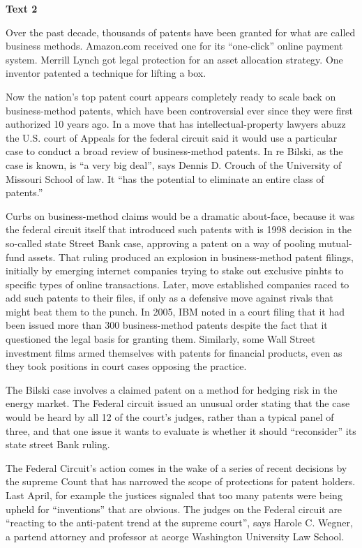 \begin{center}\textbf{Text 2}\end{center}

\qquad Over the past decade, thousands of patents have been granted for what are called business methods. Amazon.com received one for its ``one-click'' online payment system. Merrill Lynch got legal protection for an asset allocation strategy. One inventor patented a technique for lifting a box.

\qquad Now the nation's top patent court appears completely ready to scale back on business-method patents, which have been controversial ever since they were first authorized 10 years ago. In a move that has intellectual-property lawyers abuzz the U.S. court of Appeals for the federal circuit said it would use a particular case to conduct a broad review of  business-method patents. In re Bilski, as the case is known, is ``a very big deal'', says Dennis D. Crouch of the University of Missouri School of law. It ``has the potential to eliminate an entire class of patents.''

\qquad Curbs on business-method claims would be a dramatic about-face, because it was the federal circuit itself that introduced such patents with is 1998 decision in the so-called state Street Bank case, approving a patent on a way of pooling mutual-fund assets. That ruling produced an explosion in business-method patent filings, initially by emerging internet companies trying to stake out exclusive pinhts to specific types of online transactions. Later, move established companies raced to add such patents to their files, if only as a defensive move against rivals that might beat them to the punch. In 2005, IBM noted in a court filing that it had been issued more than 300 business-method patents despite the fact that it questioned the legal basis for granting them. Similarly, some Wall Street investment films armed themselves with patents for financial products, even as they took positions in court cases opposing the practice.

\qquad The Bilski case involves a claimed patent on a method for hedging risk in the energy market. The Federal circuit issued an unusual order stating that the case would be heard by all 12 of the court's judges, rather than a typical panel of three, and that one issue it wants to evaluate is whether it should ``reconsider'' its state street Bank ruling.

\qquad The Federal Circuit's action comes in the wake of  a  series of recent decisions by the supreme  Count that has narrowed the scope of protections for patent holders. Last April, for example the justices signaled that too many patents were being upheld for ``inventions'' that are obvious. The judges on the Federal circuit are ``reacting to the anti-patent trend at the supreme court'', says Harole C. Wegner, a partend attorney and professor at aeorge Washington University Law School.

